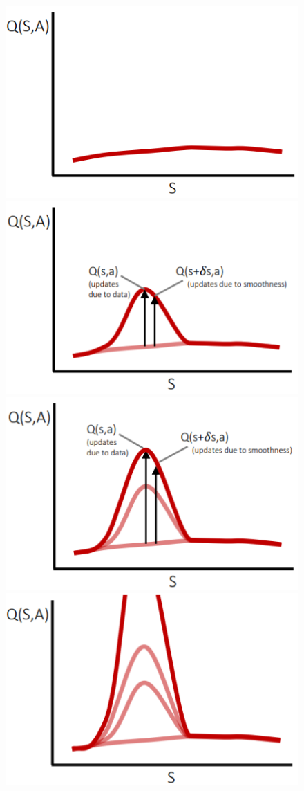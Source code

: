 \begin{figure}[H]
\centering
\includegraphics[scale=0.5]{figures/target 1.PNG}
\includegraphics[scale=0.5]{figures/target 2.PNG}\\
\includegraphics[scale=0.5]{figures/target 3.PNG}
\includegraphics[scale=0.5]{figures/target 4.PNG}

\end{figure}
